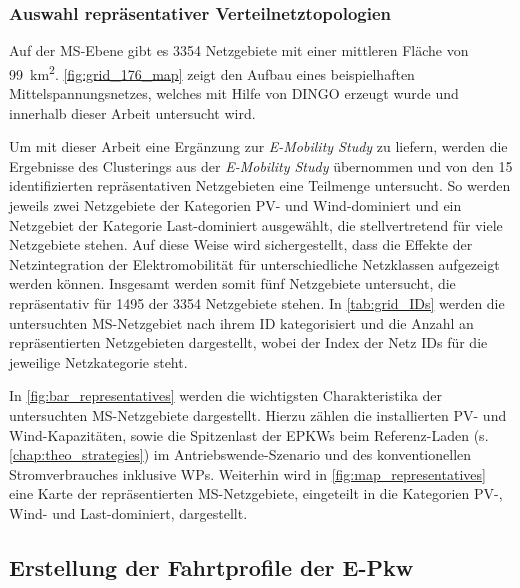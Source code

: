 \subsubsection{Auswahl repräsentativer Verteilnetztopologien}

Auf der \gls{MS}-Ebene gibt es \num{3354} Netzgebiete mit einer mittleren Fläche von \SI{99}{\km\squared}.
\autoref{fig:grid_176_map} zeigt den Aufbau eines beispielhaften Mittelspannungsnetzes, welches mit Hilfe von \gls{DINGO} erzeugt wurde und innerhalb dieser Arbeit untersucht wird.



Um mit dieser Arbeit eine Ergänzung zur \textit{E-Mobility Study} \cite{Schachler} zu liefern, werden die Ergebnisse des Clusterings aus der \textit{E-Mobility Study} übernommen und von den \num{15} identifizierten repräsentativen Netzgebieten eine Teilmenge untersucht.
So werden jeweils zwei Netzgebiete der Kategorien \gls{PV}- und Wind-dominiert und ein Netzgebiet der Kategorie Last-dominiert ausgewählt, die stellvertretend für viele Netzgebiete stehen.
Auf diese Weise wird sichergestellt, dass die Effekte der Netzintegration der Elektromobilität für unterschiedliche Netzklassen aufgezeigt werden können.
Insgesamt werden somit fünf Netzgebiete untersucht, die repräsentativ für \num{1495} der \num{3354} Netzgebiete stehen.
In \autoref{tab:grid_IDs} werden die untersuchten \gls{MS}-Netzgebiet nach ihrem \gls{ID} kategorisiert und die Anzahl an repräsentierten Netzgebieten dargestellt, wobei der Index der Netz \glspl{ID} für die jeweilige Netzkategorie steht.



In \autoref{fig:bar_representatives} werden die wichtigsten Charakteristika der untersuchten \gls{MS}-Netzgebiete dargestellt.
Hierzu zählen die installierten \gls{PV}- und Wind-Kapazitäten, sowie die Spitzenlast der \glspl{EPKW} beim Referenz-Laden (s. \autoref{chap:theo_strategies}) im Antriebswende-Szenario und des konventionellen Stromverbrauches inklusive \glspl{WP}.
Weiterhin wird in \autoref{fig:map_representatives} eine Karte der repräsentierten \gls{MS}-Netzgebiete, eingeteilt in die Kategorien \gls{PV}-, Wind- und Last-dominiert, dargestellt.






\subsection{Erstellung der Fahrtprofile der E-Pkw}\label{chap:simbev_theo}

